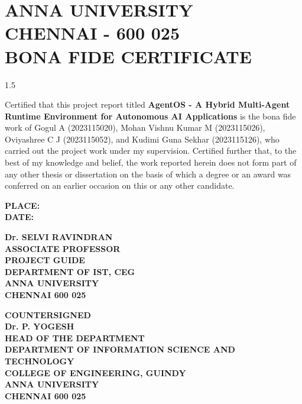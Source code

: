 \documentclass[13 pt,a4paper]{aureportm}
\begin{document}
\chapter*{ANNA UNIVERSITY\\
CHENNAI - 600 025\\
BONA FIDE CERTIFICATE}
\newlength{\aulength}
\settowidth{\aulength}{Anna University
  Chennai}
\newlength{\datewidth}
\settowidth{\datewidth}{Chennai 600 025}

\begin{spacing}{1.5}
  \begin{sloppypar}
  \fontsize{13}{14.5}\selectfont Certified that this project report titled \textbf{AgentOS - A Hybrid Multi-Agent Runtime Environment for Autonomous AI Applications} is the bona fide work of Gogul A (2023115020), Mohan Vishnu Kumar M (2023115026), Oviyashree C J (2023115052), and Kudimi Guna Sekhar (2023115126), who carried out the project work under my supervision. Certified further that, to the best of my knowledge and belief, the work reported herein does not form part of any other thesis or dissertation on the basis of which a degree or an award was conferred on an earlier occasion on this or any other candidate.
  \end{sloppypar}
\end{spacing}
\vspace{-0.3 cm}
\begin{flushleft}
 \parbox[t]{\datewidth}{\small{\textbf{PLACE: }}\\
 \small{\textbf{DATE: }}}
 \hfill
 \parbox[t]{6 cm}{\small{\textbf{Dr. SELVI RAVINDRAN}} \\
 \small{\textbf{ASSOCIATE PROFESSOR}}\\
 \small{\textbf{PROJECT GUIDE}}\\
 \small{\textbf{DEPARTMENT OF IST, CEG}}\\
 \small{\textbf{ANNA UNIVERSITY}}   \\
 \small{\textbf{CHENNAI 600 025}}
 }
\end{flushleft}
\begin{center}
 \small{\textbf{COUNTERSIGNED}}\\
  \vspace{1.5 cm}
  \textbf{\small{Dr. P. YOGESH}}\\
  \small{\textbf{HEAD OF THE DEPARTMENT}}\\
 \small{\textbf{DEPARTMENT OF INFORMATION SCIENCE AND TECHNOLOGY}}\\
 \small{\textbf{COLLEGE OF ENGINEERING, GUINDY}}\\
 \small{\textbf{ANNA UNIVERSITY}}   \\
 \small{\textbf{CHENNAI 600 025}}
 
\end{center}
\end{document}
